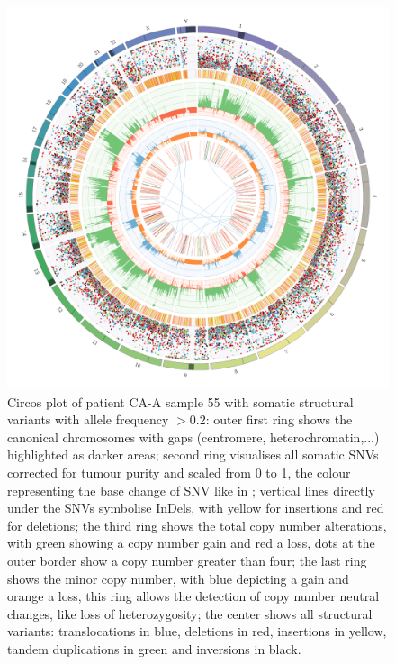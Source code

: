 \begin{figure}[!ht]
\centering
\includegraphics[width=.99\linewidth]{Figures/CASCADE/CA99/CA99-55.circos.png}
\caption[Circos plot of patient CA-A sample 55]{Circos plot of patient CA-A sample 55 with somatic structural variants with allele frequency $> 0.2$: outer first ring shows the canonical chromosomes with gaps (centromere, heterochromatin,...) highlighted as darker areas; second ring visualises all somatic SNVs corrected for tumour purity and scaled from 0 to 1, the colour representing the base change of SNV like in \protect\textcite{Alexandrov2013}; vertical lines directly under the SNVs symbolise InDels, with yellow for insertions and red for deletions; the third ring shows the total copy number alterations, with green showing a copy number gain and red a loss, dots at the outer border show a copy number greater than four; the last ring shows the minor copy number, with blue depicting a gain and orange a loss, this ring allows the detection of copy number neutral changes, like loss of heterozygosity; the center shows all structural variants: translocations in blue, deletions in red, insertions in yellow, tandem duplications in green and inversions in black.} \label{fig:ca99.55circos}
\end{figure}



